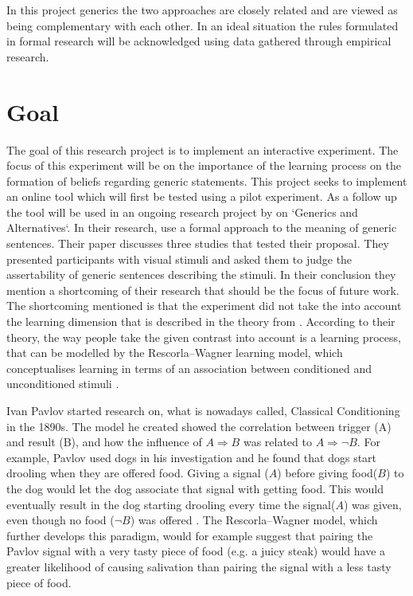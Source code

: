 \documentclass[twoside]{uva-inf-bachelor-thesis}
\theoremstyle{definition}
\begin{document}
In this project generics the two approaches are closely related and are viewed as being complementary with each other. In an ideal situation the rules formulated in formal research will be acknowledged using data gathered through empirical research.


\section{Goal}
The goal of this research project is to implement an interactive experiment. The focus of this experiment will be on the importance of the learning process on the formation of beliefs regarding generic statements. This project seeks to implement an online tool which will first be tested using a pilot experiment. As a follow up the tool will be used in an ongoing research project by \cite{RooijSchulzGenAlt} on `Generics and Alternatives`. In their research, \cite{RooijSchulzGenAlt} use a formal approach to the meaning of generic sentences. Their paper discusses three studies that tested their proposal. They presented participants with visual stimuli and asked them to judge the assertability of generic sentences describing the stimuli. In their conclusion they mention a shortcoming of their research that should be the focus of future work. The shortcoming mentioned is that the experiment did not take the into account the learning dimension that is described in the theory from \cite{RooijSchulzGenAlt}. According to their theory, the way people take the given contrast into account is a learning process, that can be modelled by the Rescorla–Wagner learning model, which conceptualises learning in terms of an association between conditioned and unconditioned stimuli \parencite{wilson_2012}. 

Ivan Pavlov started research on, what is nowadays called, Classical Conditioning in the 1890s. The model he created showed the correlation between trigger (A) and result (B), and how the influence of $A \Rightarrow B$ was related to $A \Rightarrow \neg B$. For example, Pavlov used dogs in his investigation and he found that dogs start drooling when they are offered food. Giving a signal ($A$) before giving food($B$) to the dog would let the dog associate that signal with getting food. This would eventually result in the dog starting drooling every time the signal($A$) was given, even though no food ($\neg B$) was offered \parencite{gormezano1966classical}.
The Rescorla–Wagner model, which further develops this paradigm, would for example suggest that pairing the Pavlov signal with a very tasty piece of food (e.g. a juicy steak) would have a greater likelihood of causing salivation than pairing the signal with a less tasty piece of food. 
\end{document}
